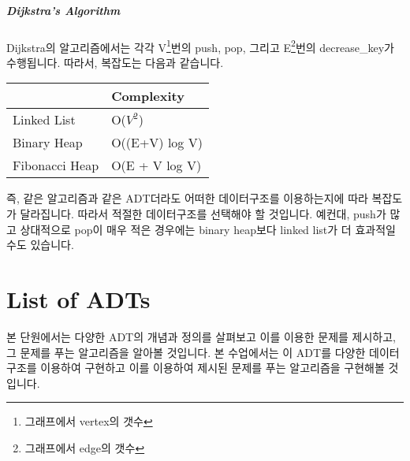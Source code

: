 \documentclass[titlepage]{report}
\begin{document}
\paragraph{Dijkstra's Algorithm} 

Dijkstra의 알고리즘에서는 각각 V\footnote{그래프에서 vertex의 갯수}번의 push, pop, 그리고 E\footnote{그래프에서 edge의 갯수}번의 decrease\_key가 수행됩니다. 따라서, 복잡도는 다음과 같습니다. 

\begin{table}[h]
\begin{tabular}{|l|l|}
\hline
               & Complexity              \\ \hline
Linked List    & O($V^2$) \\ \hline
Binary Heap    & O((E+V) log V)          \\ \hline
Fibonacci Heap & O(E + V log V)          \\ \hline
\end{tabular}
\end{table}

즉, 같은 알고리즘과 같은 ADT더라도 어떠한 데이터구조를 이용하는지에 따라 복잡도가 달라집니다. 따라서 적절한 데이터구조를 선택해야 할 것입니다. 예컨대, push가 많고 상대적으로 pop이 매우 적은 경우에는 binary heap보다 linked list가 더 효과적일 수도 있습니다. 







\chapter{List of ADTs} 

본 단원에서는 다양한 ADT의 개념과 정의를 살펴보고 이를 이용한 문제를 제시하고, 그 문제를 푸는 알고리즘을 알아볼 것입니다. 본 수업에서는 이 ADT를 다양한 데이터구조를 이용하여 구현하고 이를 이용하여 제시된 문제를 푸는 알고리즘을 구현해볼 것입니다. 
\end{document}
